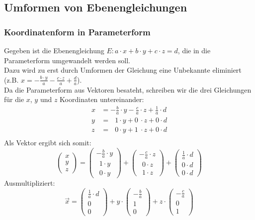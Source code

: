 \documentclass[a4paper,12pt]{article}
\begin{document}
\subsection{Umformen von Ebenengleichungen}
\subsubsection{Koordinatenform in Parameterform}
Gegeben ist die Ebenengleichung $E : a \cdot x + b \cdot y + c \cdot z = d$, die in die Parameterform umgewandelt werden soll.\\
Dazu wird zu erst durch Umformen der Gleichung eine Unbekannte eliminiert (z.B. $x = -\frac{b \cdot y}{a} - \frac{c \cdot z}{a} + \frac{d}{a}$).\\
Da die Parameterform aus Vektoren besateht, schreiben wir die drei Gleichungen für die $x$, $y$ und $z$ Koordinaten untereinander:\\
\begin{equation}
\begin{split}
x & = -\frac{b}{a} \cdot y - \frac{c}{a} \cdot z + \frac{1}{a} \cdot d\\
y & = \ \ \ 1 \cdot y + 0\ \cdot z + 0 \cdot d\\
z & = \ \ \ 0 \cdot y + 1\ \cdot z + 0 \cdot d\\
\end{split}
\end{equation}
Als Vektor ergibt sich somit:
$$\begin{pmatrix}x\\y\\z\end{pmatrix} = \begin{pmatrix}-\frac{b}{a} \cdot y\\\ \ 1 \cdot y\\\ \ 0 \cdot y\end{pmatrix} + \begin{pmatrix}- \frac{c}{a}\cdot z\\\ \ 0 \cdot z\\\ \ 1 \cdot z\end{pmatrix} + \begin{pmatrix}\frac{1}{a} \cdot d\\0 \cdot d\\0 \cdot d\end{pmatrix}$$
Ausmultipliziert:
$$\vec{x} = \begin{pmatrix}\frac{1}{a} \cdot d\\0\\0\end{pmatrix} + y \cdot \begin{pmatrix}-\frac{b}{a}\\1\\0\end{pmatrix} + z \cdot \begin{pmatrix}- \frac{c}{a}\\0\\1\end{pmatrix}$$ 
\pagebreak
\end{document}
